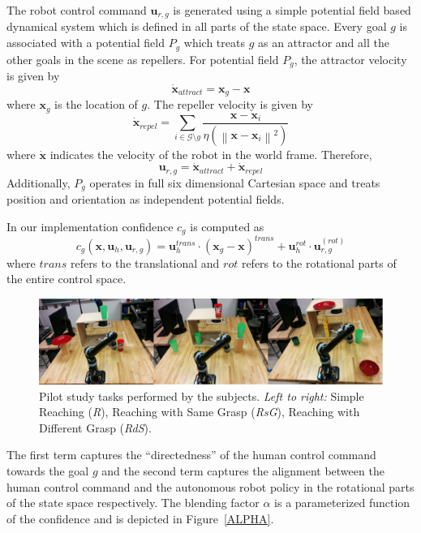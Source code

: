 \documentclass[conference]{IEEEtran}
\newcommand{\norm}[1]{\left\lVert#1\right\rVert}
\begin{document}
The robot control command $\boldsymbol{u}_{r,g}$ is generated using a simple potential field based dynamical system which is defined in all parts of the state space. Every goal $g$ is associated with a potential field $P_g$ which treats $g$ as an attractor and all the other goals in the scene as repellers. For potential field $P_g$, the attractor velocity is given by
\begin{equation*}
\dot{\boldsymbol{x}}_{attract} = \boldsymbol{x}_{g} - \boldsymbol{x}
\end{equation*}
where $\boldsymbol{x}_{g}$ is the location of $g$. The repeller velocity is given by
\begin{equation*}
\dot{\boldsymbol{x}}_{repel} = \sum_{i \in \mathcal{G} \setminus g} \frac{\boldsymbol{x} - \boldsymbol{x}_{i}}{\eta(\norm{\boldsymbol{x} - \boldsymbol{x}_{i}}^2)}
\end{equation*}
where $\dot{\boldsymbol{x}}$ indicates the velocity of the robot in the world frame. Therefore, 
\begin{equation*}
\boldsymbol{u}_{r,g} = \dot{\boldsymbol{x}}_{attract} + \dot{\boldsymbol{x}}_{repel} 
\end{equation*}
Additionally, $P_g$ operates in full six dimensional Cartesian space and treats position and orientation as independent potential fields. 

In our implementation confidence $c_g$ is computed as
\begin{equation}\label{E1}
c_g(\boldsymbol{x}, \boldsymbol{u}_h, \boldsymbol{u}_{r,g}) = \boldsymbol{u}_{h}^{trans}\cdot(\boldsymbol{x}_{g} - \boldsymbol{x})^{trans} + \boldsymbol{u}_h^{rot}\cdot\boldsymbol{u}_{r,g}^{(rot)}
\end{equation}
where $trans$ refers to the translational and $rot$ refers to the rotational parts of the entire control space. 
\begin{figure}[ht]
	\centering
	\includegraphics[width = 1\hsize]{./figures/TASKS.png}
	\caption{Pilot study tasks performed by the subjects. \textit{Left to right:} Simple Reaching (\textit{R}), Reaching with Same Grasp (\textit{RsG}), Reaching with Different Grasp (\textit{RdS}).}
	\label{TASKS}
\end{figure}
The first term captures the ``directedness'' of the human control command towards the goal $g$ and the second term captures the alignment between the human control command and the autonomous robot policy in the rotational parts of the state space respectively. 
The blending factor $\alpha$ is a parameterized function of the confidence and is depicted in Figure~\ref{ALPHA}.
\end{document}
